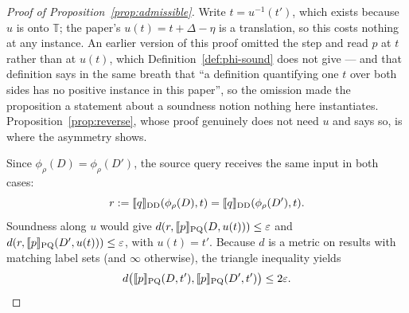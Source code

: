 \begin{proof}[Proof of Proposition~\ref{prop:admissible}]
Write $t=u^{-1}(t')$, which exists because $u$ is onto $\mathbb{T}$; the paper's
$u(t)=t+\Delta-\eta$ is a translation, so this costs nothing at any instance. An earlier
version of this proof omitted the step and read $p$ at $t$ rather than at $u(t)$, which
Definition~\ref{def:phi-sound} does not give --- and that definition says in the same
breath that ``a definition quantifying one $t$ over both sides has no positive instance
in this paper'', so the omission made the proposition a statement about a soundness
notion nothing here instantiates. Proposition~\ref{prop:reverse}, whose proof genuinely
does not need $u$ and says so, is where the asymmetry shows.

Since $\phi_\rho(D)=\phi_\rho(D')$, the source query receives the same input in both
cases:
\[
r:=\llbracket q \rrbracket_{\mathrm{DD}}(\phi_\rho(D),t)=\llbracket q \rrbracket_{\mathrm{DD}}(\phi_\rho(D'),t).
\]
Soundness along $u$ would give $d(r,\llbracket p \rrbracket_{\mathrm{PQ}}(D,u(t)))\le\varepsilon$ and
$d(r,\llbracket p \rrbracket_{\mathrm{PQ}}(D',u(t)))\le\varepsilon$, with $u(t)=t'$. Because $d$ is a metric on results with
matching label sets (and $\infty$ otherwise), the triangle inequality yields
\[
d\big(\llbracket p \rrbracket_{\mathrm{PQ}}(D,t'),\llbracket p \rrbracket_{\mathrm{PQ}}(D',t')\big)\le 2\varepsilon . \qedhere
\]
\end{proof}
